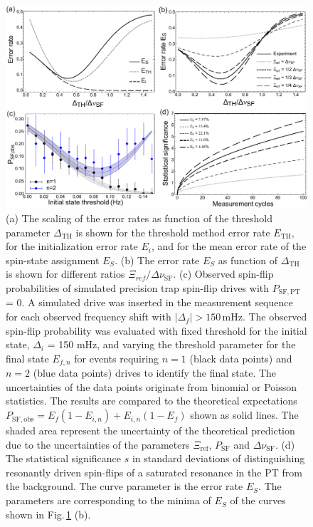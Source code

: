 \documentclass[12pt,preprint%
]{elsarticle}
\begin{document}
\begin{figure}[p]
        \centerline{\includegraphics[width=0.95 \textwidth,keepaspectratio]{FIG5SSF.pdf}}
            \caption[Filter]{(a) The scaling of the error rates as function of the threshold parameter $\Delta_{\mathrm{TH}}$ is shown for the threshold method error rate $E_{\mathrm{TH}}$, for the initialization error rate $E_i$, and for the mean error rate of the spin-state assignment $E_S$. (b) The error rate $E_S$ as function of $\Delta_{\mathrm{TH}}$ is shown for different ratios $\Xi_{ref}/\Delta\nu_{\mathrm{SF}}$. (c) Observed spin-flip probabilities of simulated precision trap spin-flip drives with $P_{\mathrm{SF,PT}}$ = 0. A simulated drive was inserted in the measurement sequence for each observed frequency shift with $|\Delta_f| > 150\,$mHz. The observed spin-flip probability was evaluated with fixed threshold for the initial state, $\Delta_i$ = 150 mHz, and varying the threshold parameter for the final state $E_{f,n}$ for events requiring $n=1$ (black data points) and $n=2$ (blue data points) drives to identify the final state. The uncertainties of the data points originate from binomial or Poisson statistics. The results are compared to the theoretical expectations $P_{\mathrm{SF,obs}}=E_f (1-E_{i,n})+E_{i,n} (1-E_f)$ shown as solid lines. The shaded area represent the uncertainty of the theoretical prediction due to the uncertainties of the parameters $\Xi_{\mathrm{ref}}$, $P_{\mathrm{SF}}$ and $\Delta\nu_{\mathrm{SF}}$. (d) The statistical significance $s$ in standard deviations of distinguishing resonantly driven spin-flips of a saturated resonance in the PT from the background. The curve parameter is the error rate $E_S$. The parameters are corresponding to the minima of $E_S$ of the curves shown in Fig.$\,$\ref{fig3} (b). } 
						\label{fig3}
    \end{figure}
\end{document}

